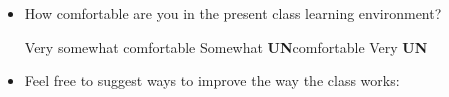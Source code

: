 \documentclass[handout]{mcs}
\begin{document}
\begin{itemize}
\item How comfortable are you in the present class learning environment?

\begin{center}
Very \hspace{0.5in} somewhat comfortable\hspace{0.5in}
Somewhat \textbf{UN}comfortable \hspace{0.5in} Very \textbf{UN}
\end{center}


\item Feel free to suggest ways to improve the way the class works:
\vspace{1in}




\end{itemize}
\end{document}
